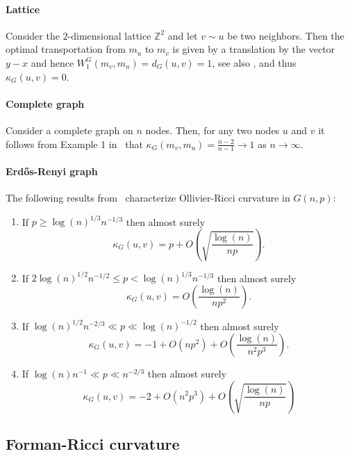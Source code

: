 \documentclass{article}
\begin{document}
\paragraph{Lattice}
Consider the $2$-dimensional lattice $\mathbb{Z}^2$ and let $v \sim u$ be two neighbors. Then the optimal transportation from $m_u$ to $m_v$ is given by a translation by the vector $y - x$ and hence $W_1^G(m_v,m_u) = d_G(u,v) = 1$, see also \cite[Example 5]{ollivier2009ricci}, and thus $\kappa_G(u,v) = 0$.

\paragraph{Complete graph}

Consider a complete graph on $n$ nodes. Then, for any two nodes $u$ and $v$ it follows from Example 1 in~\cite{jost2014ollivier} that $\kappa_G(m_v, m_u) = \frac{n-2}{n-1} \to 1$ as $n \to \infty$.

\paragraph{Erd\H{o}s-Renyi graph}

The following results from~\cite{lin2011ricci} characterize Ollivier-Ricci curvature in $G(n,p)$:

\begin{enumerate}
\item If $p \ge \log(n)^{1/3} n^{-1/3}$ then almost surely
\[
	\kappa_G(u,v) = p + O\left(\sqrt{\frac{\log(n)}{n p}}\right).
\]
\item If $2 \log(n)^{1/2} n^{-1/2} \le p < \log(n)^{1/3} n^{-1/3}$ then almost surely
\[
	\kappa_G(u,v) = O\left(\frac{\log(n)}{n p^2}\right).
\]
\item If $\log(n)^{1/2} n^{-2/3} \ll p \ll \log(n)^{-1/2}$ then almost surely
\[
	\kappa_G(u,v) = -1 + O\left(n p^2\right) + O\left(\frac{\log(n)}{n^2 p^3}\right).
\]
\item If $\log(n) n^{-1} \ll p \ll n^{-2/3}$ then almost surely
\[
	\kappa_G(u,v) = -2 + O\left(n^2 p^3\right) + O\left(\sqrt{\frac{\log(n)}{np}}\right)
\]
\end{enumerate}

\subsection{Forman-Ricci curvature}
\end{document}
